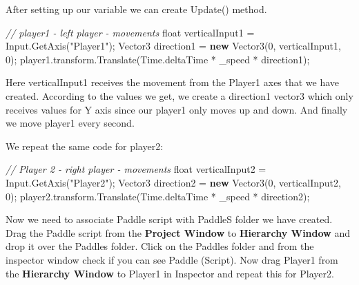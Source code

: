 \documentclass[
]{book}
\newenvironment{Shaded}{\begin{snugshade}}{\end{snugshade}}
\newcommand{\CommentTok}[1]{\textcolor[rgb]{0.56,0.35,0.01}{\textit{#1}}}
\newcommand{\DataTypeTok}[1]{\textcolor[rgb]{0.13,0.29,0.53}{#1}}
\newcommand{\DecValTok}[1]{\textcolor[rgb]{0.00,0.00,0.81}{#1}}
\newcommand{\FunctionTok}[1]{\textcolor[rgb]{0.00,0.00,0.00}{#1}}
\newcommand{\KeywordTok}[1]{\textcolor[rgb]{0.13,0.29,0.53}{\textbf{#1}}}
\newcommand{\NormalTok}[1]{#1}
\newcommand{\StringTok}[1]{\textcolor[rgb]{0.31,0.60,0.02}{#1}}
\begin{document}
After setting up our variable we can create Update() method.

\begin{Shaded}
\begin{Highlighting}[]
\CommentTok{// player1 - left player - movements}
\DataTypeTok{float}\NormalTok{ verticalInput1 = Input.}\FunctionTok{GetAxis}\NormalTok{(}\StringTok{"Player1"}\NormalTok{);}
\NormalTok{Vector3 direction1 = }\KeywordTok{new} \FunctionTok{Vector3}\NormalTok{(}\DecValTok{0}\NormalTok{, verticalInput1, }\DecValTok{0}\NormalTok{);}
\NormalTok{player1.}\FunctionTok{transform}\NormalTok{.}\FunctionTok{Translate}\NormalTok{(Time.}\FunctionTok{deltaTime}\NormalTok{ * _speed * direction1);}
\end{Highlighting}
\end{Shaded}

Here verticalInput1 receives the movement from the Player1 axes that we have created. According to the values we get, we create a direction1 vector3 which only receives values for Y axis since our player1 only moves up and down. And finally we move player1 every second.

We repeat the same code for player2:

\begin{Shaded}
\begin{Highlighting}[]
\CommentTok{// Player 2 - right player - movements }
\DataTypeTok{float}\NormalTok{ verticalInput2 = Input.}\FunctionTok{GetAxis}\NormalTok{(}\StringTok{"Player2"}\NormalTok{);}
\NormalTok{Vector3 direction2 = }\KeywordTok{new} \FunctionTok{Vector3}\NormalTok{(}\DecValTok{0}\NormalTok{, verticalInput2, }\DecValTok{0}\NormalTok{);}
\NormalTok{player2.}\FunctionTok{transform}\NormalTok{.}\FunctionTok{Translate}\NormalTok{(Time.}\FunctionTok{deltaTime}\NormalTok{ * _speed * direction2);}
\end{Highlighting}
\end{Shaded}

Now we need to associate Paddle script with PaddleS folder we have created. Drag the Paddle script from the \textbf{Project Window} to \textbf{Hierarchy Window} and drop it over the Paddles folder. Click on the Paddles folder and from the inspector window check if you can see Paddle (Script). Now drag Player1 from the \textbf{Hierarchy Window} to Player1 in Inspector and repeat this for Player2.
\end{document}
